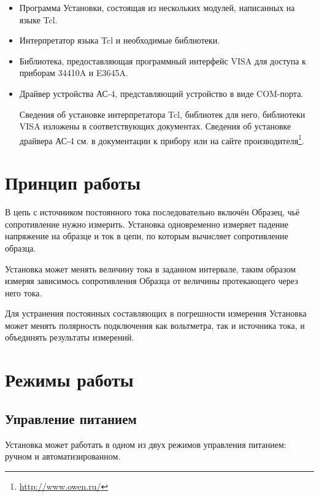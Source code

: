 \documentclass[12pt, a4paper, twocolumn]{book}
\begin{document}
\begin{itemize}

\item Программа Установки, состоящая из нескольких модулей, написанных на языке Tcl.

\item Интерпретатор языка Tcl и необходимые библиотеки.

\item Библиотека, предоставляющая программный интерфейс VISA для доступа к приборам 34410A и E3645A.

\item Драйвер устройства АС-4, представляющий устройство в виде COM-порта.

Сведения об установке интерпретатора Tcl, библиотек для него, библиотеки VISA изложены в соответствующих документах. Сведения об установке драйвера АС-4 см. в документации к прибору или на сайте производителя\footnote{\href{http://www.owen.ru/}{http://www.owen.ru/}}.

\end{itemize}

\section{Принцип работы}

В цепь с источником постоянного тока последовательно включён Образец, чьё сопротивление нужно измерить. Установка одновременно измеряет падение напряжение на образце и ток в цепи, по которым вычисляет сопротивление образца.

Установка может менять величину тока в заданном интервале, таким образом измеряя зависимось сопротивления Образца от величины протекающего через него тока.

Для устранения постоянных составляющих в погрешности измерения Установка может менять полярность подключения как вольтметра, так и источника тока, и объединять результаты измерений.

\section{Режимы работы}

\subsection{Управление питанием}

Установка может работать в одном из двух режимов управления питанием: ручном и автоматизированном.
\end{document}
